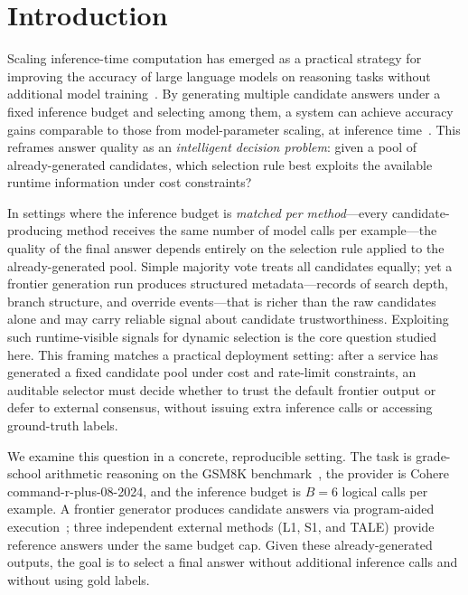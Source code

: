 \documentclass[smallcondensed]{svjour3}
\begin{document}
\section{Introduction}
\label{sec:introduction}

Scaling inference-time computation has emerged as a practical strategy for improving
the accuracy of large language models on reasoning tasks without additional model
training~\citep{snell2024scaling}.
By generating multiple candidate answers under a fixed inference budget and selecting
among them, a system can achieve accuracy gains comparable to those from model-parameter
scaling, at inference time~\citep{wang2023selfconsistency}.
This reframes answer quality as an \emph{intelligent decision problem}: given a pool of
already-generated candidates, which selection rule best exploits the available runtime
information under cost constraints?

In settings where the inference budget is \emph{matched per method}---every
candidate-producing method receives the same number of model calls per example---the
quality of the final answer depends entirely on the selection rule applied to the
already-generated pool.
Simple majority vote treats all candidates equally; yet a frontier generation run
produces structured metadata---records of search depth, branch structure, and override
events---that is richer than the raw candidates alone and may carry reliable signal
about candidate trustworthiness.
Exploiting such runtime-visible signals for dynamic selection is the core question
studied here.
This framing matches a practical deployment setting: after a service has generated a
fixed candidate pool under cost and rate-limit constraints, an auditable selector must
decide whether to trust the default frontier output or defer to external consensus,
without issuing extra inference calls or accessing ground-truth labels.

We examine this question in a concrete, reproducible setting.
The task is grade-school arithmetic reasoning on the GSM8K
benchmark~\citep{cobbe2021training}, the provider is Cohere command-r-plus-08-2024,
and the inference budget is $B = 6$ logical calls per example.
A frontier generator produces candidate answers via program-aided
execution~\citep{gao2023pal}; three independent external methods (L1, S1, and TALE)
provide reference answers under the same budget cap.
Given these already-generated outputs, the goal is to select a final answer without
additional inference calls and without using gold labels.
\end{document}
